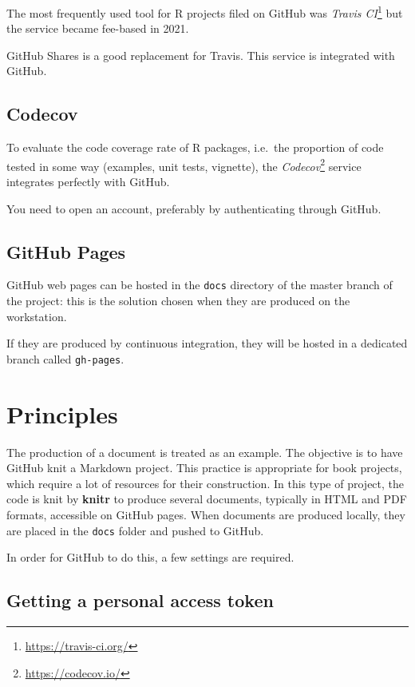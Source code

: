 \documentclass[
  12pt,
  american,
  a4paper,
  extrafontsizes,onecolumn,openright
  ]{memoir}
\newlength{\rf}
\begin{document}
The most frequently used tool for R projects filed on GitHub was \emph{Travis CI}\footnote{\url{https://travis-ci.org/}} but the service became fee-based in 2021.

GitHub Shares is a good replacement for Travis.
This service is integrated with GitHub.

\subsection{Codecov}\label{codecov}

To evaluate the code coverage rate of R packages, i.e.~the proportion of code tested in some way (examples, unit tests, vignette), the \emph{Codecov}\footnote{\url{https://codecov.io/}} service integrates perfectly with GitHub.

You need to open an account, preferably by authenticating through GitHub.

\subsection{GitHub Pages}\label{github-pages}

GitHub web pages can be hosted in the \texttt{docs} directory of the master branch of the project: this is the solution chosen when they are produced on the workstation.

If they are produced by continuous integration, they will be hosted in a dedicated branch called \texttt{gh-pages}.

\section{Principles}\label{principles}

The production of a document is treated as an example.
The objective is to have GitHub knit a Markdown project.
This practice is appropriate for book projects, which require a lot of resources for their construction.
In this type of project, the code is knit by \textbf{knitr} to produce several documents, typically in HTML and PDF formats, accessible on GitHub pages.
When documents are produced locally, they are placed in the \texttt{docs} folder and pushed to GitHub.

In order for GitHub to do this, a few settings are required.

\subsection{Getting a personal access token}\label{getting-a-personal-access-token}
\end{document}
